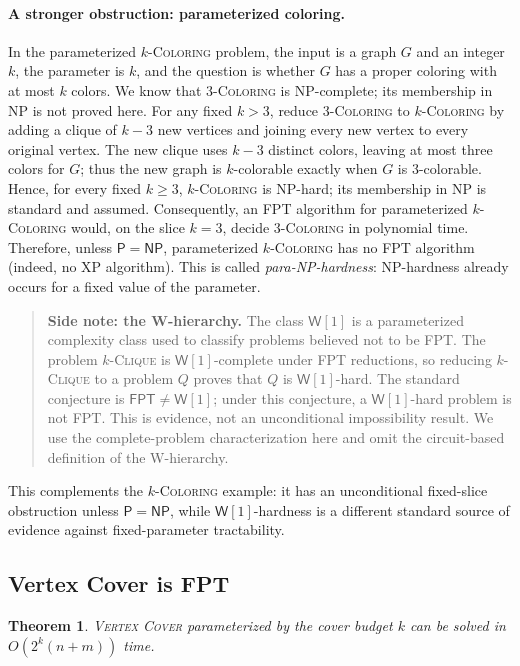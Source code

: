 \documentclass[11pt]{article}
\newtheorem{theorem}{Theorem}[section]
\newcommand{\VC}{\textsc{Vertex Cover}}
\newcommand{\FPT}{\textsf{FPT}}
\newcommand{\W}{\mathsf{W}}
\begin{document}
\paragraph{A stronger obstruction: parameterized coloring.} In the parameterized $k$-\textsc{Coloring} problem, the input is a graph $G$ and an integer $k$, the parameter is $k$, and the question is whether $G$ has a proper coloring with at most $k$ colors. We know that 3-\textsc{Coloring} is NP-complete; its membership in NP is not proved here. For any fixed $k>3$, reduce 3-\textsc{Coloring} to $k$-\textsc{Coloring} by adding a clique of $k-3$ new vertices and joining every new vertex to every original vertex. The new clique uses $k-3$ distinct colors, leaving at most three colors for $G$; thus the new graph is $k$-colorable exactly when $G$ is 3-colorable. Hence, for every fixed $k\geq 3$, $k$-\textsc{Coloring} is NP-hard; its membership in NP is standard and assumed. Consequently, an FPT algorithm for parameterized $k$-\textsc{Coloring} would, on the slice $k=3$, decide 3-\textsc{Coloring} in polynomial time. Therefore, unless $\mathsf{P}=\mathsf{NP}$, parameterized $k$-\textsc{Coloring} has no FPT algorithm (indeed, no XP algorithm). This is called \emph{para-NP-hardness}: NP-hardness already occurs for a fixed value of the parameter.

\begin{quote}\small
\textbf{Side note: the W-hierarchy.} The class $\W[1]$ is a parameterized complexity class used to classify problems believed not to be FPT. The problem $k$-\textsc{Clique} is $\W[1]$-complete under FPT reductions, so reducing $k$-\textsc{Clique} to a problem $Q$ proves that $Q$ is $\W[1]$-hard. The standard conjecture is $\FPT\neq\W[1]$; under this conjecture, a $\W[1]$-hard problem is not FPT. This is evidence, not an unconditional impossibility result. We use the complete-problem characterization here and omit the circuit-based definition of the W-hierarchy.
\end{quote}

This complements the $k$-\textsc{Coloring} example: it has an unconditional fixed-slice obstruction unless $\mathsf{P}=\mathsf{NP}$, while $\W[1]$-hardness is a different standard source of evidence against fixed-parameter tractability.

\subsection{Vertex Cover is FPT}

\begin{theorem}\label{thm:vc-fpt}
\VC{} parameterized by the cover budget $k$ can be solved in $O(2^k(n+m))$ time.
\end{theorem}
\end{document}
